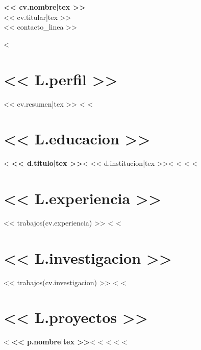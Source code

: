\documentclass[9pt,a4paper]{extarticle}
\renewcommand{\small}{\fontsize{9}{11}\selectfont}
\newlength{\entradagap}\setlength{\entradagap}{9pt}
\begin{document}
\begin{center}
{\fontsize{17}{20}\selectfont\bfseries << cv.nombre|tex >>}\\[2pt]
{\fontsize{10.5}{13}\selectfont << cv.titular|tex >>}\\[4pt]
{\small << contacto_linea >>}
\end{center}
<%

\section*{<< L.perfil >>}
<< cv.resumen|tex >>
<%
<%

\section*{<< L.educacion >>}
<%
\textbf{<< d.titulo|tex >>}<%
<< d.institucion|tex >><%
<%
<%
<%

\section*{<< L.experiencia >>}
<< trabajos(cv.experiencia) >>
<%
<%

\section*{<< L.investigacion >>}
<< trabajos(cv.investigacion) >>
<%
<%

\section*{<< L.proyectos >>}
<%
\textbf{<< p.nombre|tex >>}<%
<%
<%
<%
<%
\end{document}
